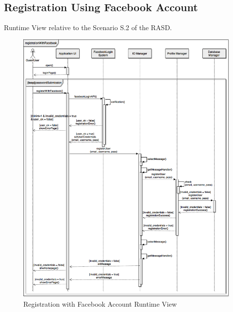 \documentclass[../../../../../../dd.tex]{subfiles}
\begin{document}
	\subsection{Registration Using Facebook Account}
		Runtime View relative to the Scenario S.2 of the RASD.
		\begin{figure}[H]
				\centering
				\includegraphics[width=\textwidth, scale=0.5]{../images/SequenceDiagrams/registrationFacebook.png}
			\caption{Registration with Facebook Account Runtime View}\label{fig:RuntimeRegistrationFacebookAccount}
		\end{figure}
		
\end{document}
